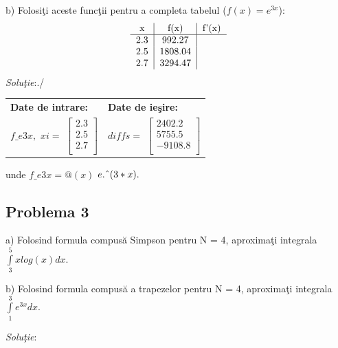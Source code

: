 \documentclass{exam}
\newcommand{\octavescript}[2]{
	
}
\begin{document}
b) Folosi\c{t}i aceste func\c{t}ii pentru a completa tabelul ($f(x)=e^{3x}$):
$$
	\begin{tabular}{ c | c | c }
		x   & f(x)    & f'(x) \\
		\hline
		2.3 & 992.27  &       \\
		2.5 & 1808.04 &       \\
		2.7 & 3294.47 &       \\
	\end{tabular}
$$
\textit{Solu\c{t}ie}:./

\octavescript{./src/DMid.m}{Metoda de derivare three-point midpoint.}
\octavescript{./src/DEnd.m}{Metoda de derivare  three-point endpoint.}
\octavescript{./src/lab11Pr2.m}{lab11Pr2.m.}

\begin{center}
	\begin{tabular}{| l | l |}
		\hline
		\textbf{Date de intrare:} & \textbf{Date de ieşire:} \\
		$f\_e3x,$
		$xi = $
		$
			\begin{bmatrix}
				2.3 \\
				2.5 \\
				2.7 \\
			\end{bmatrix}
		$
		                          &
		$diffs = $
		$
			\begin{bmatrix}
				2402.2  \\
				5755.5  \\
				-9108.8 \\
			\end{bmatrix}
		$
		\\
		\hline
	\end{tabular}
\end{center}

unde  $f\_e3x=@(x)$  $e.\char`^(3*x).$


\subsection{Problema 3}
a)	Folosind formula compus\u{a} Simpson pentru N = 4, aproxima\c{t}i integrala $\int\limits_{3}^{5}xlog(x)dx.$

b) 	 Folosind formula compus\u{a} a trapezelor pentru N = 4, aproxima\c{t}i integrala $\int\limits_{1}^{3}e^{3x} dx.$

\textit{Solu\c{t}ie}:
\octavescript{./src/compositeSimpson.m}{Formula compus\u{a} Simpson.}
\octavescript{./src/compositeTrapezoidal.m}{Formula compus\u{a} a trapezelor.}
\octavescript{./src/lab11Pr3.m}{lab11Pr3.m.}
\end{document}
